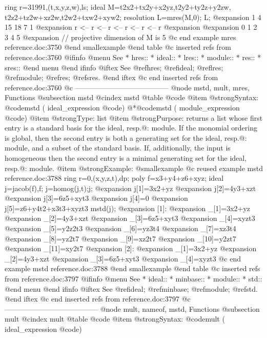 {  ring r=31991,(t,x,y,z,w),ls;
  ideal M=t2x2+tx2y+x2yz,t2y2+ty2z+y2zw,
          t2z2+tz2w+xz2w,t2w2+txw2+xyw2;
  resolution L=mres(M,0);
  L;
@expansion{}  1      4      15      18      7      1      
@expansion{} r <--  r <--  r <--   r <--   r <--  r
@expansion{} 
@expansion{} 0      1      2       3       4      5      
@expansion{} 
  // projective dimension of M is 5
@c end example mres reference.doc:3750
@end smallexample
@end table
@c inserted refs from reference.doc:3760
@ifinfo
@menu
See
* hres::
* ideal::
* lres::
* module::
* res::
* sres::
@end menu
@end ifinfo
@iftex
See
@ref{hres};
@ref{ideal};
@ref{lres};
@ref{module};
@ref{res};
@ref{sres}.
@end iftex
@c end inserted refs from reference.doc:3760
@c ---------------------------------------
@node  mstd, mult, mres, Functions
@subsection mstd
@cindex mstd
@table @code
@item @strong{Syntax:}
@code{mstd (} ideal_expression @code{)}
@*@code{mstd (} module_expression @code{)}
@item @strong{Type:}
list
@item @strong{Purpose:}
returns a list whose first entry is a standard basis for the ideal, resp.@:
module. If the monomial ordering is global, then the second entry is both
a generating set for the
ideal, resp.@: module, and a subset of the standard basis.
If, additionally, the input is homogeneous then the second entry is a
minimal generating set for the ideal, resp.@: module.
@item @strong{Example:}
@smallexample
@c reused example mstd reference.doc:3788 
  ring r=0,(x,y,z,t),dp;
  poly f=x3+y4+z6+xyz;
  ideal j=jacob(f),f;
  j=homog(j,t);j;
@expansion{} j[1]=3x2+yz
@expansion{} j[2]=4y3+xzt
@expansion{} j[3]=6z5+xyt3
@expansion{} j[4]=0
@expansion{} j[5]=z6+y4t2+x3t3+xyzt3
  mstd(j);
@expansion{} [1]:
@expansion{}    _[1]=3x2+yz
@expansion{}    _[2]=4y3+xzt
@expansion{}    _[3]=6z5+xyt3
@expansion{}    _[4]=xyzt3
@expansion{}    _[5]=y2z2t3
@expansion{}    _[6]=yz3t4
@expansion{}    _[7]=xz3t4
@expansion{}    _[8]=yz2t7
@expansion{}    _[9]=xz2t7
@expansion{}    _[10]=y2zt7
@expansion{}    _[11]=xy2t7
@expansion{} [2]:
@expansion{}    _[1]=3x2+yz
@expansion{}    _[2]=4y3+xzt
@expansion{}    _[3]=6z5+xyt3
@expansion{}    _[4]=xyzt3
@c end example mstd reference.doc:3788
@end smallexample
@end table
@c inserted refs from reference.doc:3797
@ifinfo
@menu
See
* ideal::
* minbase::
* module::
* std::
@end menu
@end ifinfo
@iftex
See
@ref{ideal};
@ref{minbase};
@ref{module};
@ref{std}.
@end iftex
@c end inserted refs from reference.doc:3797
@c ---------------------------------------
@node mult, nameof, mstd, Functions
@subsection mult
@cindex mult
@table @code
@item @strong{Syntax:}
@code{mult (} ideal_expression @code{)}
}
